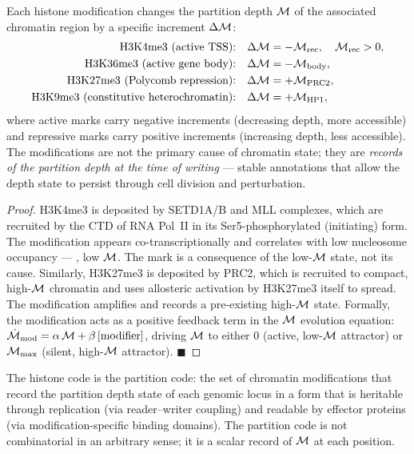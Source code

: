 \begin{theorem}
\label{thm:histone_code}
Each histone modification changes the partition depth $\mathcal{M}$ of the
associated chromatin region by a specific increment $\Delta\mathcal{M}$:
\begin{align}
  \text{H3K4me3 (active TSS):} &\quad \Delta\mathcal{M} = -\mathcal{M}_{\mathrm{rec}},
    \quad \mathcal{M}_{\mathrm{rec}} > 0,
    \label{eq:H3K4me3}\\
  \text{H3K36me3 (active gene body):} &\quad \Delta\mathcal{M} = -\mathcal{M}_{\mathrm{body}},
    \label{eq:H3K36me3}\\
  \text{H3K27me3 (Polycomb repression):} &\quad \Delta\mathcal{M} = +\mathcal{M}_{\mathrm{PRC2}},
    \label{eq:H3K27me3}\\
  \text{H3K9me3 (constitutive heterochromatin):} &\quad \Delta\mathcal{M} = +\mathcal{M}_{\mathrm{HP1}},
    \label{eq:H3K9me3}
\end{align}
where active marks carry negative increments (decreasing depth, more
accessible) and repressive marks carry positive increments (increasing depth,
less accessible). The modifications are not the primary cause of chromatin
state; they are \emph{records of the partition depth at the time of writing}
--- stable annotations that allow the depth state to persist through
cell division and perturbation.
\end{theorem}

\begin{proof}
H3K4me3 is deposited by SETD1A/B and MLL complexes, which are recruited by
the CTD of RNA Pol~II in its Ser5-phosphorylated (initiating) form. The
modification appears co-transcriptionally and correlates with low nucleosome
occupancy --- \ie, low $\mathcal{M}$. The mark is a consequence of the low-$\mathcal{M}$
state, not its cause. Similarly, H3K27me3 is deposited by PRC2, which is
recruited to compact, high-$\mathcal{M}$ chromatin and uses allosteric activation
by H3K27me3 itself to spread. The modification amplifies and records a
pre-existing high-$\mathcal{M}$ state. Formally, the modification acts as a
positive feedback term in the $\mathcal{M}$ evolution equation:
$\dot{\mathcal{M}}_{\mathrm{mod}} = \alpha\,\mathcal{M} + \beta\,[\text{modifier}]$,
driving $\mathcal{M}$ to either 0 (active, low-$\mathcal{M}$ attractor) or
$\mathcal{M}_{\max}$ (silent, high-$\mathcal{M}$ attractor). $\blacksquare$
\end{proof}

\begin{definition}
\label{def:partition_code}
The histone code is the partition code: the set of chromatin modifications
that record the partition depth state of each genomic locus in a form that is
heritable through replication (via reader--writer coupling) and readable by
effector proteins (via modification-specific binding domains). The partition
code is not combinatorial in an arbitrary sense; it is a scalar record of
$\mathcal{M}$ at each position.
\end{definition}

